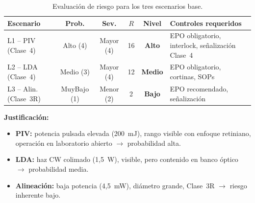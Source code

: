 \documentclass[12pt,a4paper]{article}
\begin{document}
\begin{table}[H]
	\centering
	\caption{Evaluación de riesgo para los tres escenarios base.}
	\label{tab:riesgo_base}
	\small
	\begin{tabularx}{\textwidth}{l c c c c X}
		\toprule
		\textbf{Escenario} & \textbf{Prob.}                                   & \textbf{Sev.}                 & \textbf{$R$}
		                   & \textbf{Nivel}                                   & \textbf{Controles requeridos}                                                         \\
		\midrule
		\rowcolor{aerored!15}
		L1 -- PIV (Clase~4)
		                   & Alto (4)                                         & Mayor (4)                     & 16           & \textcolor{aerored}{\textbf{Alto}}
		                   & EPO obligatorio, interlock, señalización Clase~4                                                                                         \\
		\rowcolor{aerored!10}
		L2 -- LDA (Clase~4)
		                   & Medio (3)                                        & Mayor (4)                     & 12           & \textcolor{aeroyellow}{\textbf{Medio}}
		                   & EPO obligatorio, cortinas, SOPs                                                                                                          \\
		\rowcolor{aerogreen!10}
		L3 -- Alin. (Clase~3R)
		                   & MuyBajo (1)                                      & Menor (2)                     & 2            & \textcolor{aerogreen}{\textbf{Bajo}}
		                   & EPO recomendado, señalización                                                                                                            \\
		\bottomrule
	\end{tabularx}
\end{table}

\textbf{Justificación:}
\begin{itemize}
	\item \textbf{PIV:} potencia pulsada elevada (200~mJ), rango visible con
	      enfoque retiniano, operación en laboratorio abierto $\rightarrow$
	      probabilidad alta.
	\item \textbf{LDA:} haz CW colimado (1,5~W), visible, pero contenido en
	      banco óptico $\rightarrow$ probabilidad media.
	\item \textbf{Alineación:} baja potencia (4,5~mW), diámetro grande, Clase~3R
	      $\rightarrow$ riesgo inherente bajo.
\end{itemize}
\end{document}
